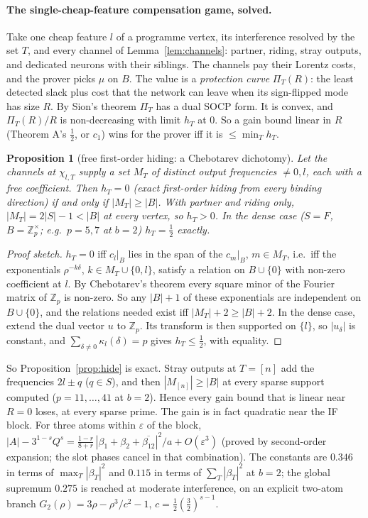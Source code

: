\documentclass[11pt]{article}
\newtheorem{proposition}[theorem]{Proposition}
\theoremstyle{definition}
\begin{document}
\paragraph{The single-cheap-feature compensation game, solved.}  Take one cheap feature $l$ of a programme vertex, its interference resolved by
the set $T$, and every channel of Lemma~\ref{lem:channels}: partner, riding, stray outputs, and dedicated neurons with their siblings.  The channels
pay their Lorentz costs, and the prover picks $\mu$ on $B$.  The value is a \emph{protection curve} $\Pi_T(R)$: the least detected slack plus cost
that the network can leave when its sign-flipped mode has size $R$.  By Sion's theorem $\Pi_T$ has a dual SOCP form.  It is convex, and $\Pi_T(R)/R$
is non-decreasing with limit $h_T$ at $0$.  So a gain bound linear in $R$ (Theorem A's $\frac12$, or $c_1$) wins for the prover iff it is $\le\min_Th_T$.
\begin{proposition}[free first-order hiding: a Chebotarev dichotomy]\label{prop:dich}
Let the channels at $\chi_{l,T}$ supply a set $M_T$ of distinct output frequencies $\ne0,l$, each with a free coefficient.  Then $h_T=0$ (exact
first-order hiding from every binding direction) if and only if $|M_T|\ge|B|$.  With partner and riding only, $|M_T|=2|S|-1<|B|$ at every vertex, so
$h_T>0$.  In the dense case ($S=F$, $B=\mathbb Z_p^\times$; e.g.\ $p=5,7$ at $b=2$) $h_T=\frac12$ exactly.
\end{proposition}
\begin{proof}[Proof sketch]
$h_T=0$ iff $c_l|_B$ lies in the span of the $c_m|_B$, $m\in M_T$, i.e.\ iff the exponentials $\rho^{-k\delta}$, $k\in M_T\cup\{0,l\}$, satisfy a relation on
$B\cup\{0\}$ with non-zero coefficient at $l$.  By Chebotarev's theorem every square minor of the Fourier matrix of $\mathbb Z_p$ is non-zero.  So any
$|B|+1$ of these exponentials are independent on $B\cup\{0\}$, and the relations needed exist iff $|M_T|+2\ge|B|+2$.  In the dense case, extend
the dual vector $u$ to $\mathbb Z_p$.  Its transform is then supported on $\{l\}$, so $|u_\delta|$ is constant, and $\sum_{\delta\ne0}\kappa_l(\delta)=p$ gives
$h_T\le\frac12$, with equality.
\end{proof}
So Proposition~\ref{prop:hide} is exact.  Stray outputs at $T=[n]$ add the frequencies $2l\pm q$ ($q\in S$), and then $|M_{[n]}|\ge|B|$ at every sparse
support computed ($p=11,\dots,41$ at $b=2$).  Hence every gain bound that is linear near $R=0$ loses, at every sparse prime.  The gain is in
fact quadratic near the IF block.  For three atoms within $\varepsilon$ of the block,
$|A|-3^{1-s}Q^s=\frac{1-r}{8+r}\,|\beta_1+\beta_2+\overline{\beta_{12}}|^2/a+O(\varepsilon^3)$ (proved by second-order expansion; the slot phases cancel in that
combination).  The constants are $0.346$ in terms of $\max_T|\beta_T|^2$ and $0.115$ in terms of $\sum_T|\beta_T|^2$ at $b=2$; the global supremum $0.275$
is reached at moderate interference, on an explicit two-atom branch $G_2(\rho)=3\rho-\rho^3/c^2-1$, $c=\frac12(\frac32)^{s-1}$.
\end{document}
